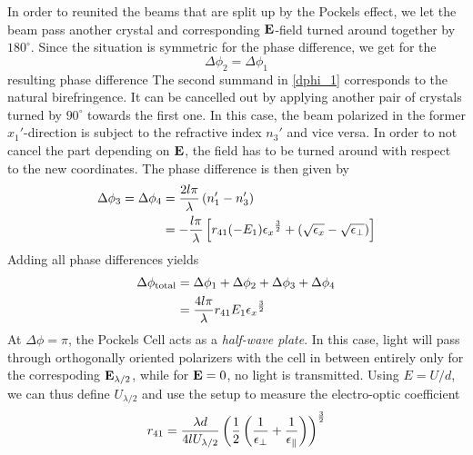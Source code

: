 In order to reunited the beams that are split up by the Pockels effect, 
we let the beam pass another crystal and corresponding $\mathbf{E}$-field 
turned around together by $180^\circ$. 
Since the situation is symmetric for the phase difference, we get for the 
\begin{equation}
    \Delta \phi_2 = \Delta \phi_1
\end{equation}
resulting phase difference  
The second summand in \eqref{dphi_1} corresponds to the natural birefringence. 
It can be cancelled out by applying another pair of crystals turned by 
$90^\circ$ towards the first one. In this case, the beam polarized 
in the former $x_1'$-direction is subject to the refractive index 
$n_3'$ and vice versa. In order to not cancel the part depending on $\mathbf{E}$, 
the field has to be turned around with respect to the new coordinates. 
The phase difference is then given by 
\begin{equation}
    \begin{split}
    \Delta \phi_3 = \Delta \phi_4
    &= \frac{2l \pi}{\lambda} \left(n_1' - n_3' \right) \\
    &= -\frac{l \pi}{\lambda}\left[
    r_{41} (-E_1) {\epsilon_x}^\frac{3}{2} + 
    \left(\sqrt{\epsilon_x} - \sqrt{\epsilon_\perp}
    \right)
    \right]
   \end{split}
    \label{eq:dphi_34}
\end{equation}
Adding all phase differences yields
\begin{equation}
    \begin{split}
    \Delta \phi_\mathrm{total}  
    &= \Delta \phi_1 + \Delta \phi_2 + \Delta \phi_3 + \Delta \phi_4 \\
    &= \frac{4l \pi}{\lambda} r_{41} E_1 {\epsilon_x}^\frac{3}{2} 
    \end{split}
    \label{eq:dphi_34}
\end{equation}
At $\Delta \phi = \pi$, the Pockels Cell acts as a \emph{half-wave plate}. 
In this case, light will pass through orthogonally oriented polarizers 
with the cell in between entirely only for the correspoding $\mathbf{E}_{\lambda/2}$,
while for $\mathbf{E} = 0$, no light is transmitted. Using $E = U / d$, we can thus 
define $U_{\lambda / 2}$ and use the setup to measure the electro-optic 
coefficient 
\begin{equation}
    r_{41} = \frac{\lambda d}{4 l U_{\lambda / 2}} 
    \left(\frac{1}{2} \left(\frac{1}{\epsilon_\perp} + \frac{1}{\epsilon_\parallel}\right)\right)^{\frac{3}{2}}
    \label{eq:r_41_U}
\end{equation}

